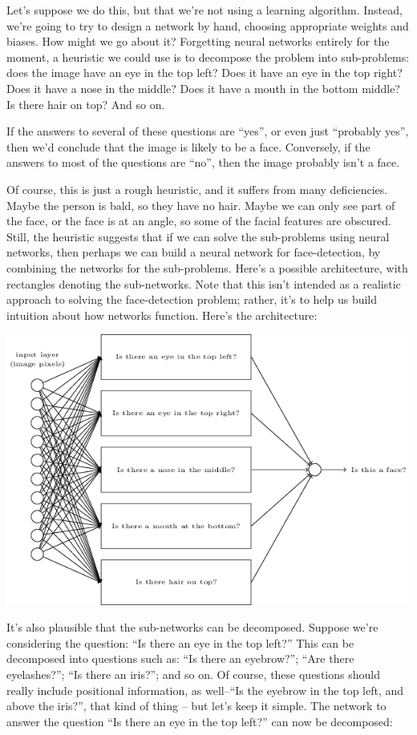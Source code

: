 \documentclass[a4paper,twoside,10pt]{book}
\begin{document}
Let's suppose we do this, but that we're not using a learning algorithm. Instead, we're going to try to design a network by hand, choosing appropriate weights and biases. How might we go about it? Forgetting neural networks entirely for the moment, a heuristic we could use is to decompose the problem into sub-problems: does the image have an eye in the top left? Does it have an eye in the top right? Does it have a nose in the middle? Does it have a mouth in the bottom middle? Is there hair on top? And so on.

If the answers to several of these questions are ``yes'', or even just ``probably yes'', then we'd conclude that the image is likely to be a face. Conversely, if the answers to most of the questions are ``no'', then the image probably isn't a face.

Of course, this is just a rough heuristic, and it suffers from many deficiencies. Maybe the person is bald, so they have no hair. Maybe we can only see part of the face, or the face is at an angle, so some of the facial features are obscured. Still, the heuristic suggests that if we can solve the sub-problems using neural networks, then perhaps we can build a neural network for face-detection, by combining the networks for the sub-problems. Here's a possible architecture, with rectangles denoting the sub-networks. Note that this isn't intended as a realistic approach to solving the face-detection problem; rather, it's to help us build intuition about how networks function. Here's the architecture:

\begin{center}
	\includegraphics[width=\linewidth]{./figures/ch1/tikz14}
\end{center}
It's also plausible that the sub-networks can be decomposed. Suppose we're considering the question: ``Is there an eye in the top left?'' This can be decomposed into questions such as: ``Is there an eyebrow?''; ``Are there eyelashes?''; ``Is there an iris?''; and so on. Of course, these questions should really include positional information, as well--``Is the eyebrow in the top left, and above the iris?'', that kind of thing -- but let's keep it simple. The network to answer the question ``Is there an eye in the top left?'' can now be decomposed:
\end{document}
